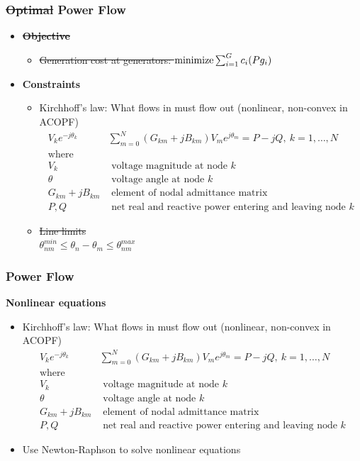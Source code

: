 \begin{frame}[fragile]
  \frametitle{\sout{Optimal} Power Flow}
  \begin{itemize}
    \item {\bf \sout{Objective}}
    \begin{itemize}
      \item \sout{Generation cost at generators:
      $ \minimize \sum^G_{i=1} c_i(Pg_i)$}
    \end{itemize}
    \item {\bf Constraints}
    \begin{itemize}
      \item Kirchhoff's law: What flows in must flow out (nonlinear, non-convex in ACOPF)
      \begin{align*}
        V_k e^{-j\theta_k} & \sum^{N}_{m=0} (G_{km} + jB_{km})V_m e^{j\theta_m} = P - jQ,\ k = 1, \dots, N \\
        \text{where}\\
        V_k &\text{ voltage magnitude at node } k\\
        \theta &\text{ voltage angle at node } k\\
        G_{km} + jB_{km}& \text{ element of nodal admittance matrix}\\
        P, Q &\text{ net real and reactive power entering and leaving node } k
      \end{align*}
      \item \sout{Line limits}\\
      \sout{$ \theta^{min}_{nm} \leq \theta_n - \theta_m \leq \theta^{max}_{nm}$}
    \end{itemize}
  \end{itemize}
\end{frame}

\begin{frame}[fragile]
  \frametitle{Power Flow}
  {\bf Nonlinear equations}
  \begin{itemize}
      \item Kirchhoff's law: What flows in must flow out (nonlinear, non-convex in ACOPF)
      \begin{align*}
        V_k e^{-j\theta_k} & \sum^{N}_{m=0} (G_{km} + jB_{km})V_m e^{j\theta_m} = P - jQ,\ k = 1, \dots, N \\
        \text{where}\\
        V_k &\text{ voltage magnitude at node } k\\
        \theta &\text{ voltage angle at node } k\\
        G_{km} + jB_{km}& \text{ element of nodal admittance matrix}\\
        P, Q &\text{ net real and reactive power entering and leaving node } k
      \end{align*}
      \item Use Newton-Raphson to solve nonlinear equations
  \end{itemize}
\end{frame}

